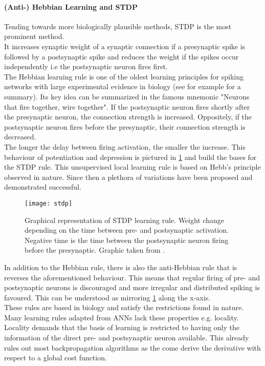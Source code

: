 \paragraph{(Anti-) Hebbian Learning and STDP}
Tending towards more biologically plausible methods, \ac{STDP} is the most prominent method.\\
It increases synaptic weight of a synaptic connection if a presynaptic spike is followed by a postsynaptic spike and reduces the weight if the spikes occur independently i.e the postsynaptic neuron fires first.\\
The Hebbian learning rule is one of the oldest learning principles for spiking networks with large experimental evidence in biology (see for example \cite{feldman_spike-timing_2012} for a summary). Its key idea can be summarized in the famous mnemonic "Neurons that fire together, wire together". If the postsynaptic neuron fires shortly after the presynaptic neuron, the connection strength is increased. Oppositely, if the postsynaptic neuron fires before the presynaptic, their connection strength is decreased.\\
The longer the delay between firing activation, the smaller the increase. This behaviour of potentiation and depression is pictured in \cref{fig:stdp} and build the bases for the \ac{STDP} rule. This unsupervised local learning rule is based on Hebb's principle observed in nature. Since then a plethora of variations have been proposed and demonstrated successful\cite{vigneron_critical_2020,tavanaei_bp-stdp_2019,yamazaki_spiking_2022}.
\begin{figure}
	\centering
	\texttt{[image: stdp]}
	\caption{Graphical representation of STDP learning rule. Weight change depending on the time between pre- and postsynaptic activation. Negative time is the time between the postsynaptic neuron firing before the presynaptic. Graphic taken from \cite{yi_learning_2023}.}
	\label{fig:stdp}
\end{figure}
In addition to the Hebbian rule, there is also the anti-Hebbian rule that is reverses the aforementioned behaviour. This means that regular firing of pre- and postsynaptic neurons is discouraged and more irregular and distributed spiking is favoured. This can be understood as mirroring \cref{fig:stdp} along the x-axis.\\

These rules are based in biology and satisfy the restrictions found in nature. Many learning rules adapted from \acp{ANN} lack these properties e.g. locality.\\
Locality demands that the basis of learning is restricted to having only the information of the direct pre- and postsynaptic neuron available. This already rules out most backpropagation algorithms as the come derive the derivative with respect to a global cost function.\\

